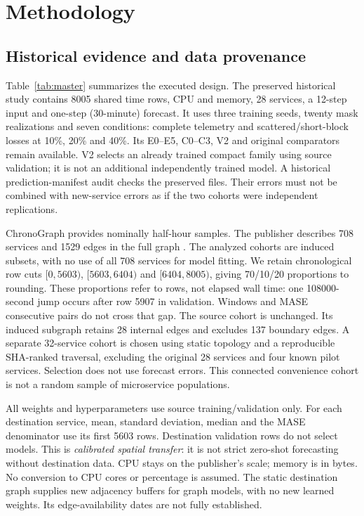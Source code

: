 \section{Methodology}
\subsection{Historical evidence and data provenance}
Table~\ref{tab:master} summarizes the executed design. The preserved historical study contains 8005 shared time rows, CPU and memory, 28 services, a 12-step input and one-step (30-minute) forecast. It uses three training seeds, twenty mask realizations and seven conditions: complete telemetry and scattered/short-block losses at 10\%, 20\% and 40\%. Its E0--E5, C0--C3, V2 and original comparators remain available. V2 selects an already trained compact family using source validation; it is not an additional independently trained model. A historical prediction-manifest audit checks the preserved files. Their errors must not be combined with new-service errors as if the two cohorts were independent replications.

ChronoGraph provides nominally half-hour samples. The publisher describes 708 services and 1529 edges in the full graph \cite{chronograph}. The analyzed cohorts are induced subsets, with no use of all 708 services for model fitting. We retain chronological row cuts $[0,5603)$, $[5603,6404)$ and $[6404,8005)$, giving 70/10/20 proportions to rounding. These proportions refer to rows, not elapsed wall time: one 108000-second jump occurs after row 5907 in validation. Windows and MASE consecutive pairs do not cross that gap. The source cohort is unchanged. Its induced subgraph retains 28 internal edges and excludes 137 boundary edges. A separate 32-service cohort is chosen using static topology and a reproducible SHA-ranked traversal, excluding the original 28 services and four known pilot services. Selection does not use forecast errors. This connected convenience cohort is not a random sample of microservice populations.

All weights and hyperparameters use source training/validation only. For each destination service, mean, standard deviation, median and the MASE denominator use its first 5603 rows. Destination validation rows do not select models. This is \emph{calibrated spatial transfer}: it is not strict zero-shot forecasting without destination data. CPU stays on the publisher's scale; memory is in bytes. No conversion to CPU cores or percentage is assumed. The static destination graph supplies new adjacency buffers for graph models, with no new learned weights. Its edge-availability dates are not fully established.

